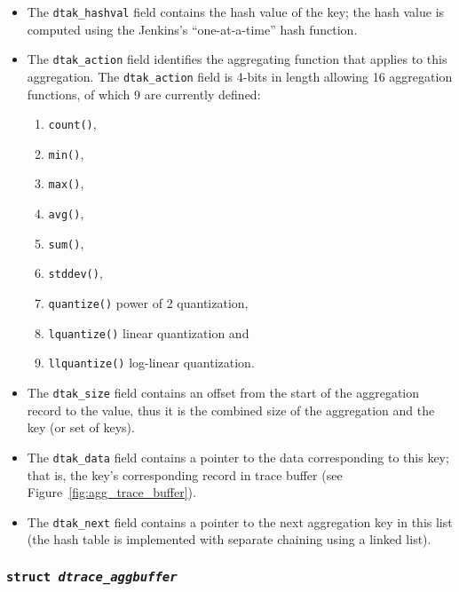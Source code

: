 \begin{itemize}

	\item The \texttt{dtak\_hashval} field contains the hash value of the key;
the hash value is computed using the Jenkins's ``one-at-a-time'' hash function.

	\item The \texttt{dtak\_action} field identifies the aggregating function
that applies to this aggregation. The \texttt{dtak\_action} field is 4-bits in
length allowing 16 aggregation functions, of which 9 are currently defined:

	\begin{enumerate}

		\item \texttt{count()},  
		\item \texttt{min()},
		\item \texttt{max()},
		\item \texttt{avg()},
		\item \texttt{sum()},
		\item \texttt{stddev()},
		\item \texttt{quantize()} power of 2 quantization,
		\item \texttt{lquantize()} linear quantization and
		\item \texttt{llquantize()} log-linear quantization.

	\end{enumerate}

	\item The \texttt{dtak\_size} field contains an offset from the start of
the aggregation record to the value, thus it is the combined size of the
aggregation and the key (or set of keys).

	\item The \texttt{dtak\_data} field contains a pointer to the data
corresponding to this key; that is, the key's corresponding record in trace
buffer (see Figure~\ref{fig:agg_trace_buffer}).

	\item The \texttt{dtak\_next} field contains a pointer to the next
aggregation key in this list (the hash table is implemented with separate
chaining using a linked list).

\end{itemize}

\subsubsection{\texttt{struct~\textit{dtrace\_aggbuffer}}}
\label{subsubsec:dtagb}

